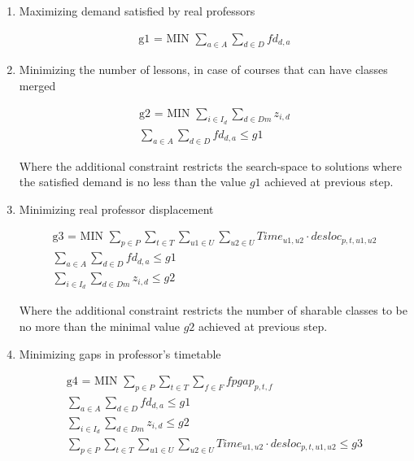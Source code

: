 \begin{enumerate}

\item{Maximizing demand satisfied by real professors}

\begin{align*}
   \mbox{g1 = MIN  } \sum\limits_{a \in A}\sum\limits_{d \in D} fd_{d,a}
\end{align*}

\item{Minimizing the number of lessons, in case of courses that can have classes merged}

\begin{align*}
  \mbox{g2 = MIN  } \sum\limits_{i \in I_{d}} \sum\limits_{d \in Dm} z_{i,d}
	\\
	\sum\limits_{a \in A}\sum\limits_{d \in D} fd_{d,a} \le g1
\end{align*}

Where the additional constraint restricts the search-space to solutions where the satisfied demand is no less than the value $g1$ achieved at previous step.

\item{Minimizing real professor displacement}

\begin{align*}
  \mbox{g3 = MIN  } \sum\limits_{p \in P} \sum\limits_{t \in T} \sum\limits_{u1 \in U} \sum\limits_{u2 \in U} Time_{u1,u2} \cdot desloc_{p,t,u1,u2}
	\\
	\sum\limits_{a \in A}\sum\limits_{d \in D} fd_{d,a} \le g1
	\\
	\sum\limits_{i \in I_{d}} \sum\limits_{d \in Dm} z_{i,d} \le g2
\end{align*}

Where the additional constraint restricts the number of sharable classes to be no more than the minimal value $g2$ achieved at previous step.

\item{Minimizing gaps in professor's timetable}

\begin{align*}
   \mbox{g4 = MIN  } \sum\limits_{p \in P} \sum\limits_{t \in T} \sum\limits_{f \in F} fpgap_{p,t,f}
	\\
	\sum\limits_{a \in A}\sum\limits_{d \in D} fd_{d,a} \le g1
	\\
	\sum\limits_{i \in I_{d}} \sum\limits_{d \in Dm} z_{i,d} \le g2
	\\
	\sum\limits_{p \in P} \sum\limits_{t \in T} \sum\limits_{u1 \in U} \sum\limits_{u2 \in U} Time_{u1,u2} \cdot desloc_{p,t,u1,u2} \le g3
\end{align*}


\end{enumerate}

